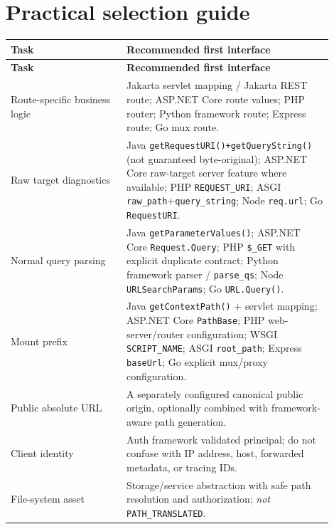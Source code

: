 \documentclass[10pt,letterpaper,oneside]{article}
\newcommand{\code}[1]{\texttt{#1}}
\begin{document}
\section{Practical selection guide}
\begin{longtable}{P{0.32\linewidth}P{0.58\linewidth}}
\toprule\textbf{Task} & \textbf{Recommended first interface}\\\midrule\endfirsthead
\toprule\textbf{Task} & \textbf{Recommended first interface}\\\midrule\endhead
Route-specific business logic & Jakarta servlet mapping / Jakarta REST route; ASP.NET Core route values; PHP router; Python framework route; Express route; Go mux route.\\
Raw target diagnostics & Java \code{getRequestURI()+getQueryString()} (not guaranteed byte-original); ASP.NET Core raw-target server feature where available; PHP \code{REQUEST\_URI}; ASGI \code{raw\_path}+\code{query\_string}; Node \code{req.url}; Go \code{RequestURI}.\\
Normal query parsing & Java \code{getParameterValues()}; ASP.NET Core \code{Request.Query}; PHP \code{\$\_GET} with explicit duplicate contract; Python framework parser / \code{parse\_qs}; Node \code{URLSearchParams}; Go \code{URL.Query()}.\\
Mount prefix & Java \code{getContextPath()} + servlet mapping; ASP.NET Core \code{PathBase}; PHP web-server/router configuration; WSGI \code{SCRIPT\_NAME}; ASGI \code{root\_path}; Express \code{baseUrl}; Go explicit mux/proxy configuration.\\
Public absolute URL & A separately configured canonical public origin, optionally combined with framework-aware path generation.\\
Client identity & Auth framework validated principal; do not confuse with IP address, host, forwarded metadata, or tracing IDs.\\
File-system asset & Storage/service abstraction with safe path resolution and authorization; \emph{not} \code{PATH\_TRANSLATED}.\\
\bottomrule
\end{longtable}
\end{document}
